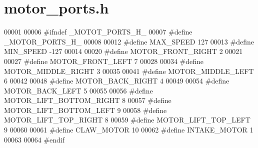 \section{motor\+\_\+ports.\+h}
\label{motor__ports_8h_source}

\begin{DoxyCode}
00001 
00006 \textcolor{preprocessor}{#ifndef \_MOTOT\_PORTS\_H\_}
00007 \textcolor{preprocessor}{#define \_MOTOR\_PORTS\_H\_}
00008 
00012 \textcolor{preprocessor}{#define MAX\_SPEED 127}
00013 \textcolor{preprocessor}{#define MIN\_SPEED -127}
00014 
00020 \textcolor{preprocessor}{#define MOTOR\_FRONT\_RIGHT 2}
00021 
00027 \textcolor{preprocessor}{#define MOTOR\_FRONT\_LEFT 7}
00028 
00034 \textcolor{preprocessor}{#define MOTOR\_MIDDLE\_RIGHT 3}
00035 
00041 \textcolor{preprocessor}{#define MOTOR\_MIDDLE\_LEFT 6}
00042 
00048 \textcolor{preprocessor}{#define MOTOR\_BACK\_RIGHT 4}
00049 
00054 \textcolor{preprocessor}{#define MOTOR\_BACK\_LEFT 5}
00055 
00056 \textcolor{preprocessor}{#define MOTOR\_LIFT\_BOTTOM\_RIGHT 8}
00057 \textcolor{preprocessor}{#define MOTOR\_LIFT\_BOTTOM\_LEFT 9}
00058 \textcolor{preprocessor}{#define MOTOR\_LIFT\_TOP\_RIGHT 8}
00059 \textcolor{preprocessor}{#define MOTOR\_LIFT\_TOP\_LEFT 9}
00060 
00061 \textcolor{preprocessor}{#define CLAW\_MOTOR 10}
00062 \textcolor{preprocessor}{#define INTAKE\_MOTOR 1}
00063 
00064 \textcolor{preprocessor}{#endif}
\end{DoxyCode}
